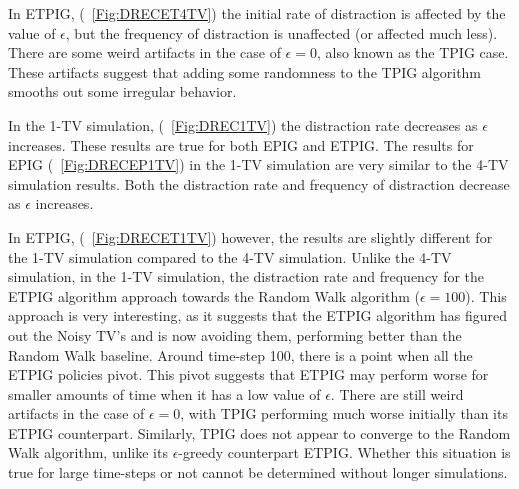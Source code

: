 \documentclass[12pt]{thesis}
\begin{document}
In ETPIG, (\figurename~\ref{Fig:DRECET4TV}) the initial rate of distraction is affected by the value of $\epsilon$, but the frequency of distraction is unaffected (or affected much less). There are some weird artifacts in the case of $\epsilon = 0$, also known as the TPIG case. These artifacts suggest that adding some randomness to the TPIG algorithm smooths out some irregular behavior.

In the 1-TV simulation, (\figurename~\ref{Fig:DREC1TV}) the distraction rate decreases as $\epsilon$ increases. These results are true for both EPIG and ETPIG. The results for EPIG (\figurename~\ref{Fig:DRECEP1TV}) in the 1-TV simulation are very similar to the 4-TV simulation results. Both the distraction rate and frequency of distraction decrease as $\epsilon$ increases.

In ETPIG, (\figurename~\ref{Fig:DRECET1TV}) however, the results are slightly different for the 1-TV simulation compared to the 4-TV simulation. Unlike the 4-TV simulation, in the 1-TV simulation, the distraction rate and frequency for the ETPIG algorithm approach towards the Random Walk algorithm ($\epsilon = 100$). This approach is very interesting, as it suggests that the ETPIG algorithm has figured out the Noisy TV's and is now avoiding them, performing better than the Random Walk baseline. Around time-step 100, there is a point when all the ETPIG policies pivot. This pivot suggests that ETPIG may perform worse for smaller amounts of time when it has a low value of $\epsilon$. There are still weird artifacts in the case of $\epsilon = 0$, with TPIG performing much worse initially than its ETPIG counterpart. Similarly, TPIG does not appear to converge to the Random Walk algorithm, unlike its $\epsilon$-greedy counterpart ETPIG. Whether this situation is true for large time-steps or not cannot be determined without longer simulations. 
\end{document}

